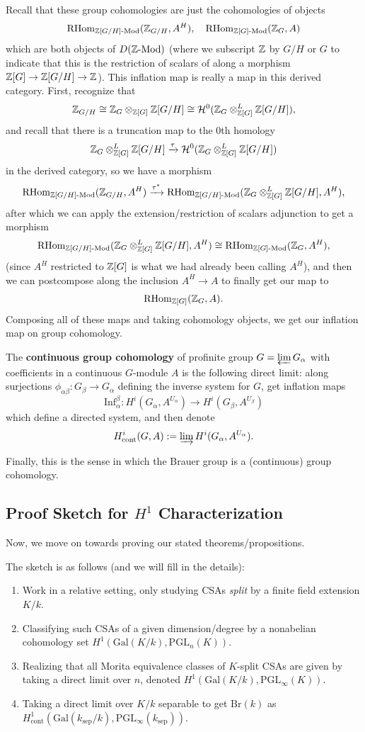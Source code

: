 \documentclass[12pt]{article}
\newcommand{\sep}{\text{sep}}
\newcommand{\Br}{\mathrm{Br}}
\newcommand{\Gal}{\mathrm{Gal}}
\newcommand{\PGL}{\mathrm{PGL}}
\newcommand{\Inf}{\mathrm{Inf}}
\begin{document}
Recall that these group cohomologies are just the cohomologies of objects
\[\operatorname{RHom}_{\mathbb{Z}[G/H]\text{-}\mathrm{Mod}}(\mathbb{Z}_{G/H}, A^H), \quad \operatorname{RHom}_{\mathbb{Z}[G]\text{-}\mathrm{Mod}}(\mathbb{Z}_G, A)\]
which are both objects of $D(\mathbb{Z}\text{-}\mathrm{Mod})$ (where we subscript $\mathbb{Z}$ by $G/H$ or $G$ to indicate that this is the restriction of scalars of along a morphism $\mathbb{Z}[G]\to \mathbb{Z}[G/H]\to \mathbb{Z}$). This inflation map is really a map in this derived category. First, recognize that
\[\mathbb{Z}_{G/H} \cong \mathbb{Z}_G \otimes_{\mathbb{Z}[G]} \mathbb{Z}[G/H] \cong \mathcal{H}^0(\mathbb{Z}_G \otimes^L_{\mathbb{Z}[G]} \mathbb{Z}[G/H]),\]
and recall that there is a truncation map to the 0th homology
\[\mathbb{Z}_G \otimes^L_{\mathbb{Z}[G]} \mathbb{Z}[G/H] \xrightarrow{\tau} \mathcal{H}^0(\mathbb{Z}_G \otimes^L_{\mathbb{Z}[G]} \mathbb{Z}[G/H])\]
in the derived category, so we have a morphism
\[\operatorname{RHom}_{\mathbb{Z}[G/H]\text{-}\mathrm{Mod}}(\mathbb{Z}_{G/H}, A^H) \xrightarrow{\tau^*} \operatorname{RHom}_{\mathbb{Z}[G/H]\text{-}\mathrm{Mod}}(\mathbb{Z}_{G} \otimes^L_{\mathbb{Z}[G]} \mathbb{Z}[G/H], A^H),\]
after which we can apply the extension/restriction of scalars adjunction to get a morphism
\[\operatorname{RHom}_{\mathbb{Z}[G/H]\text{-}\mathrm{Mod}}(\mathbb{Z}_{G} \otimes^L_{\mathbb{Z}[G]} \mathbb{Z}[G/H], A^H) \cong \operatorname{RHom}_{\mathbb{Z}[G]\text{-}\mathrm{Mod}}(\mathbb{Z}_{G}, A^H),\]
(since $A^H$ restricted to $\mathbb{Z}[G]$ is what we had already been calling $A^H$), and then we can postcompose along the inclusion $A^H\to A$ to finally get our map to
\[\operatorname{RHom}_{\mathbb{Z}[G]}(\mathbb{Z}_G, A).\]
Composing all of these maps and taking cohomology objects, we get our inflation map on group cohomology.

\begin{defn}
    The \textbf{continuous group cohomology} of profinite group $G=\varprojlim G_\alpha$ with coefficients in a continuous $G$-module $A$ is the following direct limit: along surjections $\phi_{\alpha\beta}: G_\beta \to G_\alpha$ defining the inverse system for $G$, get inflation maps
    \[\Inf_\alpha^\beta: H^i(G_\alpha, A^{U_\alpha}) \to H^i(G_\beta, A^{U_\beta})\]
    which define a directed system, and then denote
    \[H_{\text{cont}}^i(G,A) := \varinjlim H^i(G_\alpha,A^{U_\alpha}).\]
\end{defn}

Finally, this is the sense in which the Brauer group is a (continuous) group cohomology.


\subsection{Proof Sketch for $H^1$ Characterization}

Now, we move on towards proving our stated theorems/propositions.

The sketch is as follows (and we will fill in the details):
\begin{enumerate}
    \item Work in a relative setting, only studying CSAs \textit{split} by a finite field extension $K/k$.
    \item Classifying such CSAs of a given dimension/degree by a nonabelian cohomology set $H^1(\Gal(K/k), \PGL_n(K))$.
    \item Realizing that all Morita equivalence classes of $K$-split CSAs are given by taking a direct limit over $n$, denoted $H^1(\Gal(K/k), \PGL_\infty(K))$.
    \item Taking a direct limit over $K/k$ separable to get $\Br(k)$ as $H^1_{\text{cont}}(\Gal(k_\sep/k), \PGL_\infty(k_\sep))$.
\end{enumerate}
\end{document}

